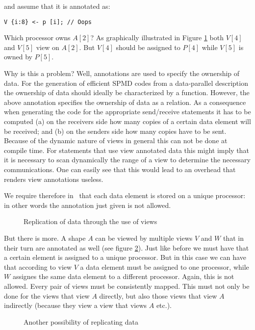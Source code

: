 and assume that it is annotated as:

\begin{verbatim}
V {i:8} <- p [i]; // Oops
\end{verbatim}

Which processor owns $A[2]$? As graphically illustrated in Figure
\ref{Replicate} both $V[4]$ and $V[5]$ view on $A[2]$. But $V[4]$
should be assigned to $P[4]$ while $V[5]$ is owned by $P[5]$.

Why is this a problem? Well, annotations are used to specify the
ownership of data. For the generation of efficient SPMD codes from a
data-parallel description the ownership of data should ideally be
characterized by a function. However, the above annotation specifies
the ownership of data as a relation. As a consequence when generating
the code for the appropriate send/receive statements it has to be
computed (a) on the receivers side how many copies of a certain data
element will be received; and (b) on the senders side how many copies
have to be sent. Because of the dynamic nature of views in general
this can not be done at compile time. For statements that use view
annotated data this might imply that it is necessary to scan
dynamically the range of a view to determine the necessary
communications. One can easily see that this would lead to an overhead
that renders view annotations useless.

We require therefore in \Booster\ that each data element is stored on
a unique processor: in other words the annotation just given is not
allowed.

\begin{figure}
\begin{center}
\begin{minipage}{0.5\textwidth}
\end{minipage}
\end{center}
\caption{Replication of data through the use of views \label{Replicate}}
\end{figure}

But there is more. A shape $A$ can be viewed by multiple views $V$ and
$W$ that in their turn are annotated as well (see figure
\ref{DoubleView}). Just like before we must have that a certain
element is assigned to a unique processor. But in this case we can
have that according to view $V$ a data element must be assigned to one
processor, while $W$ assignes the same data element to a different
processor.  Again, this is not allowed. Every pair of views must be
consistently mapped.  This must not only be done for the views that
view $A$ directly, but also those views that view $A$ indirectly
(because they view a view that views $A$ etc.).

\begin{figure}
\begin{center}
\begin{minipage}{0.5\textwidth}
\end{minipage}
\end{center}
\caption{Another possibility of replicating data \label{DoubleView}}
\end{figure}
